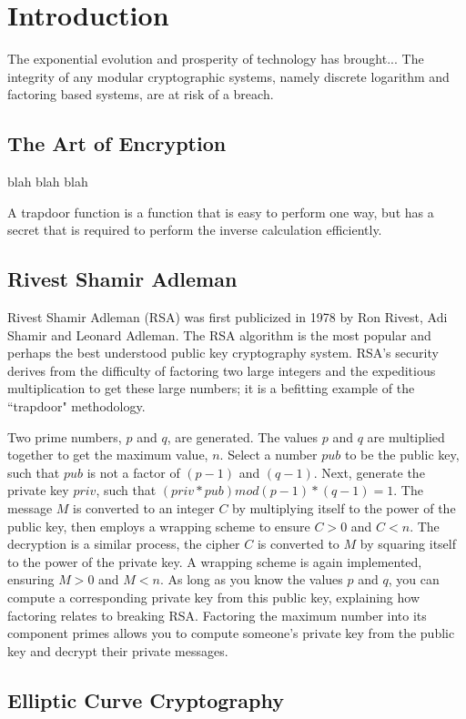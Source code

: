 \section{Introduction}
The exponential evolution and prosperity of technology has brought...
The integrity of any modular cryptographic systems, namely discrete logarithm and factoring based systems, are at risk of a breach. 

\subsection{The Art of Encryption}
blah blah blah

A trapdoor function is a function that is easy to perform one way, but has a secret that is required to perform the inverse calculation efficiently. 

\subsection{Rivest Shamir Adleman}
 Rivest Shamir Adleman (RSA) was first publicized in 1978 by Ron Rivest, Adi Shamir and Leonard Adleman. The RSA algorithm is the most popular and  perhaps the best understood public key cryptography system. RSA's security derives from the difficulty of factoring two large integers and the expeditious multiplication to get these large numbers; it is a befitting example of the ``trapdoor" methodology. 
 
 Two prime numbers, \(p\) and \(q\), are generated. The values \(p\) and \(q\) are multiplied together to get the maximum value, \(n\). Select a number \(pub\) to be the public key, such that \(pub\) is not a factor of \((p - 1)\) and \((q - 1)\). Next, generate the private key \(priv\), such that \((priv * pub) mod (p - 1) * (q - 1) = 1\). The message \(M\) is converted to an integer \(C\) by multiplying itself to the power of the public key, then employs a wrapping scheme to ensure \(C > 0\) and \(C < n\). The decryption is a similar process, the cipher \(C\) is converted to \(M\) by squaring itself to the power of the private key. A wrapping scheme is again implemented, ensuring \(M > 0\) and \(M < n\). As long as you know the values \(p\) and \(q\), you can compute a corresponding private key from this public key, explaining how factoring relates to breaking RSA. Factoring the maximum number into its component primes allows you to compute someone's private key from the public key and decrypt their private messages.

\subsection{Elliptic Curve Cryptography}

